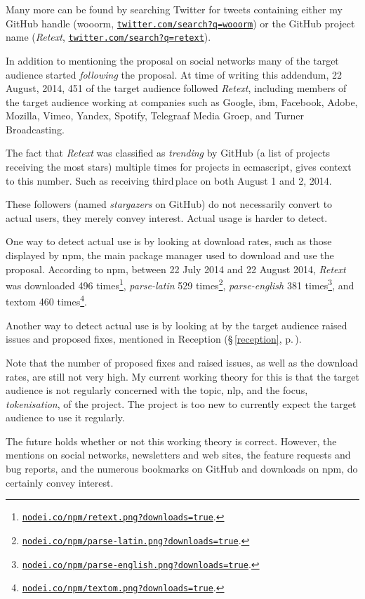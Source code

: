\noindent Many more can be found by searching Twitter for tweets containing
  either my GitHub handle (wooorm,
  \href{https://twitter.com/search?f=realtime&q=wooorm}{\nolinkurl{twitter.com/search?q=wooorm}})
  or the GitHub project name (\emph{Retext},
  \href{https://twitter.com/search?f=realtime&q=retext}{\nolinkurl{twitter.com/search?q=retext}}).

In addition to mentioning the proposal on social networks many of the target
  audience started \emph{following} the proposal.
At time of writing this addendum, 22 August, 2014, 451 of the target
  audience followed \emph{Retext}, including members of the target audience
  working at companies such as Google, \gls{ibm}, Facebook, Adobe, Mozilla,
  Vimeo, Yandex, Spotify, Telegraaf Media Groep, and Turner Broadcasting.

The fact that \emph{Retext} was classified as \emph{trending} by GitHub (a
  list of projects receiving the most stars) multiple times for projects in
  \gls{ecmascript}, gives context to this number.
Such as receiving third\,place on both August 1 and 2, 2014.

These followers (named \emph{stargazers} on GitHub) do not necessarily convert
  to actual users, they merely convey interest.
Actual usage is harder to detect.

One way to detect actual use is by looking at download rates, such as
  those displayed by \gls{npm}, the main package manager used to download
  and use the proposal.
According to \gls{npm}, between 22 July 2014 and 22 August 2014, \emph{Retext}
  was downloaded 496 times\footnote{
    \href{https://nodei.co/npm/retext.png?downloads=true}{\nolinkurl{nodei.co/npm/retext.png?downloads=true}}.
  }, \emph{parse-latin} 529 times\footnote{
    \href{https://nodei.co/npm/parse-latin.png?downloads=true}{\nolinkurl{nodei.co/npm/parse-latin.png?downloads=true}}.
  }, \emph{parse-english} 381 times\footnote{
    \href{https://nodei.co/npm/parse-english.png?downloads=true}{\nolinkurl{nodei.co/npm/parse-english.png?downloads=true}}.
  },
  and \gls{textom} 460 times\footnote{
    \href{https://nodei.co/npm/textom.png?downloads=true}{\nolinkurl{nodei.co/npm/textom.png?downloads=true}}.
  }.

Another way to detect actual use is by looking at by the target audience
  raised issues and proposed fixes, mentioned in Reception (§\,\ref{reception},
  p.\,\pageref{reception}).

Note that the number of proposed fixes and raised issues, as well as the
  download rates, are still not very high.
My current working theory for this is that the target audience is not
  regularly concerned with the topic, \gls{nlp}, and the focus,
  \emph{tokenisation}, of the project.
The project is too new to currently expect the target audience to use it
  regularly.

The future holds whether or not this working theory is correct.
However, the mentions on social networks, newsletters and web sites,
  the feature requests and bug reports, and the numerous bookmarks on
  GitHub and downloads on \gls{npm}, do certainly convey interest.

\endgroup
